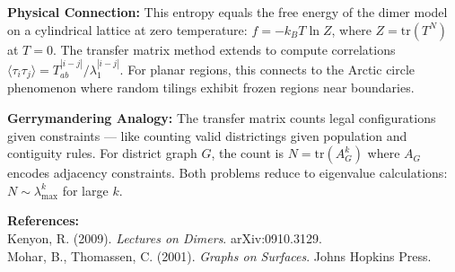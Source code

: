 \begin{technical}
\noindent\textbf{Physical Connection:} This entropy equals the free energy of the dimer model on a cylindrical lattice at zero temperature: $f = -k_B T \ln Z$, where $Z = \text{tr}(T^N)$ at $T=0$. The transfer matrix method extends to compute correlations $\langle \tau_i \tau_j \rangle = T^{|i-j|}_{ab}/\lambda_1^{|i-j|}$. For planar regions, this connects to the Arctic circle phenomenon where random tilings exhibit frozen regions near boundaries.

\noindent\textbf{Gerrymandering Analogy:} The transfer matrix counts legal configurations given constraints — like counting valid districtings given population and contiguity rules. For district graph $G$, the count is $N = \text{tr}(A_G^k)$ where $A_G$ encodes adjacency constraints. Both problems reduce to eigenvalue calculations: $N \sim \lambda_{\max}^k$ for large $k$.

\vspace{0.5em}
\noindent\textbf{References:}\\
{\footnotesize
Kenyon, R. (2009). \textit{Lectures on Dimers}. arXiv:0910.3129.\\
Mohar, B., Thomassen, C. (2001). \textit{Graphs on Surfaces}. Johns Hopkins Press.
}
\end{technical}